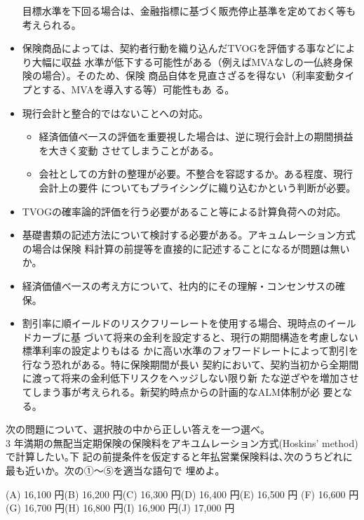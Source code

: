 \documentclass[report,gutter=10mm,fore-edge=10mm,uplatex,dvipdfmx]{jlreq}
\begin{document}
\begin{itemize}
目標水準を下回る場合は、金融指標に基づく販売停止基準を定めておく等も考えられる。
 \item 保険商品によっては、契約者行動を織り込んだTVOGを評価する事などにより大幅に収益
水準が低下する可能性がある（例えばMVAなしの一仏終身保険の場合）。そのため、保険
商品自体を見直さざるを得ない（利率変動タイプとする、MVAを導入する等）可能性もあ
る。
 \item 現行会計と整合的ではないことへの対応。
\begin{itemize}
 \item 経済価値べ一スの評価を重要視した場合は、逆に現行会計上の期間損益を大きく変動
させてしまうことがある。
 \item 会社としての方針の整理が必要。不整合を容認するか。ある程度、現行会計上の要件
についてもプライシングに織り込むかという判断が必要。
\end{itemize}
 \item TVOGの確率論的評価を行う必要があること等による計算負荷への対応。
 \item 基礎書類の記述方法について検討する必要がある。アキュムレーション方式の場合は保険
料計算の前提等を直接的に記述することになるが問題は無いか。
 \item 経済価値べ一スの考え方について、社内的にその理解・コンセンサスの確保。
 \item 割引率に順イールドのリスクフリーレートを使用する場合、現時点のイールドカーブに基
づいて将来の金利を設定すると、現行の期間構造を考慮しない標準利率の設定よりもはる
かに高い水準のフォワードレートによって割引を行なう恐れがある。特に保険期間が長い
契約において、契約当初から全期間に渡って将来の金利低下リスクをヘッジしない限り新
たな逆ざやを増加させてしまう事が考えられる。新契約時点からの計画的なALM体制が必
要となる。
\end{itemize}

次の問題について、選択肢の中から正しい答えを一つ選べ。\\
3 年満期の無配当定期保険の保険料をアキユムレーション方式(Hoskins' method)で計算したい｡下
記の前提条件を仮定すると年払営業保険料は､次のうちどれに最も近いか。次の①～⑤を適当な語句で
埋めよ。

(A) 16,100 円(B) 16,200 円(C) 16,300 円(D) 16,400 円(E) 16,500 円
(F) 16,600 円(G) 16,700 円(H) 16,800 円(I) 16,900 円(J) 17,000 円
\end{document}
